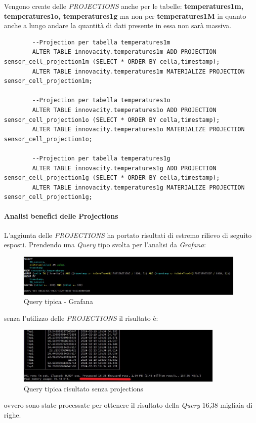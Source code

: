     Vengono create delle \textit{PROJECTIONS} anche per le tabelle:  \textbf{temperatures1m, temperatures1o, temperatures1g}
    ma non per  \textbf{temperatures1M} in quanto anche a lungo andare la quantità di dati presente in essa non sarà massiva.

    \begin{lstlisting}
        --Projection per tabella temperatures1m
        ALTER TABLE innovacity.temperatures1m ADD PROJECTION sensor_cell_projection1m (SELECT * ORDER BY cella,timestamp);
        ALTER TABLE innovacity.temperatures1m MATERIALIZE PROJECTION sensor_cell_projection1m;

        --Projection per tabella temperatures1o
        ALTER TABLE innovacity.temperatures1o ADD PROJECTION sensor_cell_projection1o (SELECT * ORDER BY cella,timestamp);
        ALTER TABLE innovacity.temperatures1o MATERIALIZE PROJECTION sensor_cell_projection1o;

        --Projection per tabella temperatures1g
        ALTER TABLE innovacity.temperatures1g ADD PROJECTION sensor_cell_projection1g (SELECT * ORDER BY cella,timestamp);
        ALTER TABLE innovacity.temperatures1g MATERIALIZE PROJECTION sensor_cell_projection1g;
    \end{lstlisting}

    \paragraph{Analisi benefici delle Projections}\label{sec:temp_projections_benefici}
    L'aggiunta delle \textit{PROJECTIONS} ha portato risultati di estremo rilievo di seguito esposti.
    Prendendo una \textit{Query} tipo svolta per l'analisi da \textit{Grafana}:
    \begin{figure}[H]
        \centering
        \includegraphics[width=1\textwidth]{../Images/SpecificaTecnica/ProjectionQuery.jpg}
        \caption{Query tipica - Grafana}
        \label{fig:ProjectionsQuery}
      \end{figure}
    senza l'utilizzo delle \textit{PROJECTIONS} il risultato è:
    \begin{figure}[H]
        \centering
        \includegraphics[width=0.9\textwidth]{../Images/SpecificaTecnica/SenzaProectionResult.jpg}
        \caption{Query tipica risultato senza projections}
        \label{fig:ProjectionsQueryWthout}
      \end{figure}
      ovvero sono state processate per ottenere il risultato della \textit{Query} 16,38 migliaia di righe.

